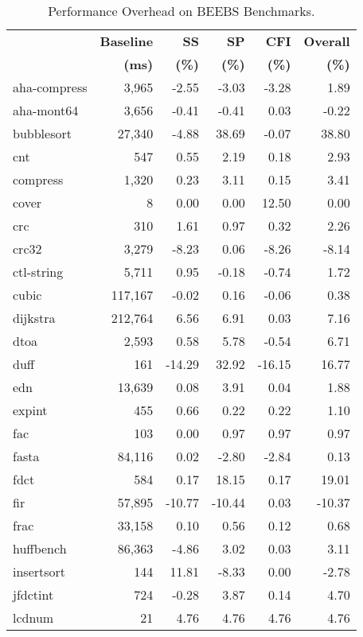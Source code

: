 %
%
\begin{table}[ptb]
\caption{Performance Overhead on BEEBS Benchmarks.}
\centering
\sffamily
\footnotesize{
\begin{tabular}{@{}lrrrrr@{}}
\toprule
& \textbf{Baseline} & \textbf{SS} & \textbf{SP} & \textbf{CFI} & \textbf{Overall} \\
& \textbf{(ms)} & \textbf{(\%)} & \textbf{(\%)} & \textbf{(\%)} & \textbf{(\%)} \\
\midrule
aha-compress & 3,965 & -2.55 & -3.03 & -3.28 & 1.89 \\
aha-mont64 & 3,656 & -0.41 & -0.41 & 0.03 & -0.22 \\
bubblesort & 27,340 & -4.88 & 38.69 & -0.07 & 38.80 \\
cnt & 547 & 0.55 & 2.19 & 0.18 & 2.93 \\
compress & 1,320 & 0.23 & 3.11 & 0.15 & 3.41 \\
cover & 8 & 0.00 & 0.00 & 12.50 & 0.00 \\
crc & 310 & 1.61 & 0.97 & 0.32 & 2.26 \\
crc32 & 3,279 & -8.23 & 0.06 & -8.26 & -8.14 \\
ctl-string & 5,711 & 0.95 & -0.18 & -0.74 & 1.72 \\
cubic & 117,167 & -0.02 & 0.16 & -0.06 & 0.38 \\
dijkstra & 212,764 & 6.56 & 6.91 & 0.03 & 7.16 \\
dtoa & 2,593 & 0.58 & 5.78 & -0.54 & 6.71 \\
duff & 161 & -14.29 & 32.92 & -16.15 & 16.77 \\
edn & 13,639 & 0.08 & 3.91 & 0.04 & 1.88 \\
expint & 455 & 0.66 & 0.22 & 0.22 & 1.10 \\
fac & 103 & 0.00 & 0.97 & 0.97 & 0.97 \\
fasta & 84,116 & 0.02 & -2.80 & -2.84 & 0.13 \\
fdct & 584 & 0.17 & 18.15 & 0.17 & 19.01 \\
fir & 57,895 & -10.77 & -10.44 & 0.03 & -10.37 \\
frac & 33,158 & 0.10 & 0.56 & 0.12 & 0.68 \\
huffbench & 86,363 & -4.86 & 3.02 & 0.03 & 3.11 \\
insertsort & 144 & 11.81 & -8.33 & 0.00 & -2.78 \\
jfdctint & 724 & -0.28 & 3.87 & 0.14 & 4.70 \\
lcdnum & 21 & 4.76 & 4.76 & 4.76 & 4.76 \\

\end{tabular}}
\end{table}
